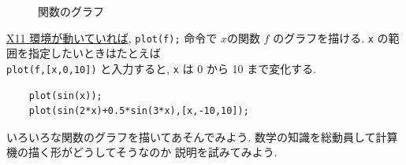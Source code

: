 \documentclass{jbook}
\begin{document}
\begin{figure}[thb]
\begin{center}
\end{center}
\caption{関数のグラフ}
\end{figure}

\noindent
\HHH
{}  
\underline{X11 環境が動いていれば},
{\tt plot(f);}   命令で
$x$の関数 $f$ のグラフを描ける.
{\tt x} の範囲を指定したいときはたとえば  \\
{\tt plot(f,[x,0,10])}
と入力すると, {\tt x} は 0 から 10 まで変化する.

\noindent {}
\begin{screen}
\begin{verbatim}
    plot(sin(x));  
    plot(sin(2*x)+0.5*sin(3*x),[x,-10,10]);  
\end{verbatim}
\end{screen}
\begin{problem} \rm
いろいろな関数のグラフを描いてあそんでみよう.
数学の知識を総動員して計算機の描く形がどうしてそうなのか
説明を試みてみよう.
\end{problem}
\end{document}
